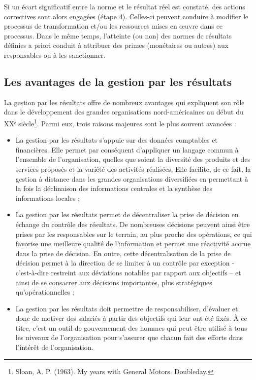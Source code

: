 \documentclass[oneside]{kaobook}
\begin{document}
Si un écart significatif entre la norme et le résultat réel est constaté, des actions correctives sont alors engagées (étape 4). Celles-ci peuvent conduire à modifier le processus de transformation et/ou les ressources mises en œuvre dans ce processus. Dans le même temps, l’atteinte (ou non) des normes de résultats définies a priori conduit à attribuer des primes (monétaires ou autres) aux responsables ou à les sanctionner.
\subsection{Les avantages de la gestion par les résultats}
\label{sec:org1402a02}
La gestion par les résultats offre de nombreux avantages qui expliquent son rôle dans le développement des grandes organisations nord-américaines au début du XXᵉ siècle\footnote{Sloan, A. P. (1963). My years with General Motors. Doubleday.}. Parmi eux, trois raisons majeures sont le plus souvent avancées :
\begin{itemize}
\item La gestion par les résultats s’appuie sur des données comptables et financières. Elle permet par conséquent d’appliquer un langage commun à l’ensemble de l’organisation, quelles que soient la diversité des produits et des services proposés et la variété des activités réalisées. Elle facilite, de ce fait, la gestion à distance dans les grandes organisations diversifiées en permettant à la fois la déclinaison des informations centrales et la synthèse des informations locales ;
\item La gestion par les résultats permet de décentraliser la prise de décision en échange du contrôle des résultats. De nombreuses décisions peuvent ainsi être prises par les responsables sur le terrain, au plus proche des opérations, ce qui favorise une meilleure qualité de l’information et permet une réactivité accrue dans la prise de décision. En outre, cette décentralisation de la prise de décision permet à la direction de se limiter à un contrôle par exception - c’est-à-dire restreint aux déviations notables par rapport aux objectifs – et ainsi de se consacrer aux décisions importantes, plus stratégiques qu’opérationnelles ;
\item La gestion par les résultats doit permettre de responsabiliser, d’évaluer et donc de motiver des salariés à partir des objectifs qui leur ont été fixés. À ce titre, c’est un outil de gouvernement des hommes qui peut être utilisé à tous les niveaux de l’organisation pour s’assurer que chacun fait des efforts dans l’intérêt de l’organisation.
\end{itemize}
\end{document}
